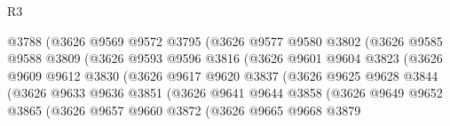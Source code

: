 \begin{lexlean}{R3}
\begin{coremodule}
                              @3788
                              (@3626
                                @9569
                                @9572
                                @3795
                                (@3626
                                  @9577
                                  @9580
                                  @3802
                                  (@3626
                                    @9585
                                    @9588
                                    @3809
                                    (@3626
                                      @9593
                                      @9596
                                      @3816
                                      (@3626
                                        @9601
                                        @9604
                                        @3823
                                        (@3626
                                          @9609
                                          @9612
                                          @3830
                                          (@3626
                                            @9617
                                            @9620
                                            @3837
                                            (@3626
                                              @9625
                                              @9628
                                              @3844
                                              (@3626
                                                @9633
                                                @9636
                                                @3851
                                                (@3626
                                                  @9641
                                                  @9644
                                                  @3858
                                                  (@3626
                                                    @9649
                                                    @9652
                                                    @3865
                                                    (@3626
                                                      @9657
                                                      @9660
                                                      @3872
                                                      (@3626
                                                        @9665
                                                        @9668
                                                        @3879

\end{coremodule}
\end{lexlean}
